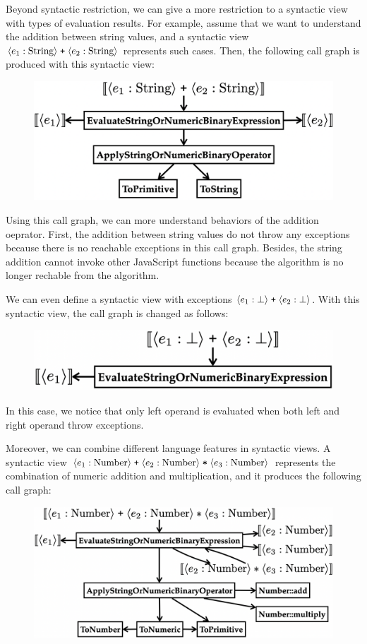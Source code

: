 Beyond syntactic restriction, we can give a more restriction to a syntactic view
with types of evaluation results.  For example, assume that we want to
understand the addition between string values, and a syntactic view
$\langle e_1: \text{String} \rangle \; \texttt{+} \; \langle e_2: \text{String} \rangle$
represents such cases.  Then, the following call graph is produced with this
syntactic view:
\begin{figure}[H]
  \centering
  \includegraphics[width=.8\columnwidth]{img/add-str.png}
\end{figure} \noindent
Using this call graph, we can more understand behaviors of the addition
oeprator.  First, the addition between string values do not throw any exceptions
because there is no reachable exceptions in this call graph.  Besides, the
string addition cannot invoke other JavaScript functions because the
 algorithm is no longer rechable from the 
algorithm.

We can even define a syntactic view with exceptions $\langle e_1: \bot \rangle \;
\texttt{+} \; \langle e_2: \bot \rangle$.  With this syntactic view, the call graph
is changed as follows:
\begin{figure}[H]
  \centering
  \includegraphics[width=.7\columnwidth]{img/add-exc.png}
\end{figure} \noindent
In this case, we notice that only left operand is evaluated when both left and
right operand throw exceptions.

Moreover, we can combine different language features in syntactic views.  A
syntactic view
$\langle e_1: \text{Number} \rangle \;
\texttt{+} \;
\langle e_2: \text{Number} \rangle \;
\texttt{*} \;
\langle e_3: \text{Number} \rangle$
represents the combination of numeric addition and multiplication, and it
produces the following call graph:
\begin{figure}[H]
  \centering
  \includegraphics[width=\columnwidth]{img/add-mul.png}
\end{figure}



